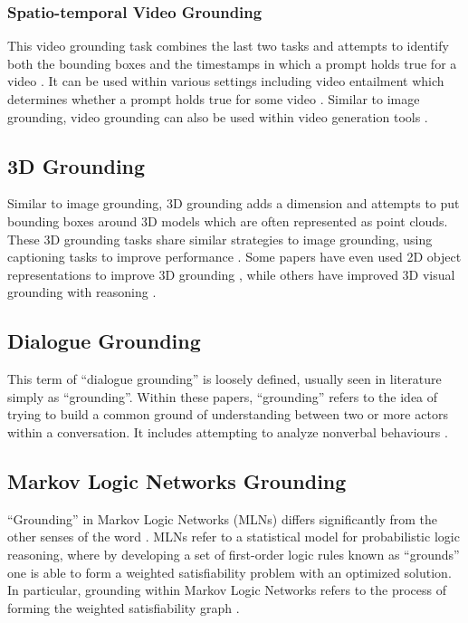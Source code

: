\documentclass[11pt]{article}
\begin{document}
\subsubsection{Spatio-temporal Video Grounding}
This video grounding task combines the last two tasks and attempts to identify both the bounding boxes and the timestamps in which a prompt holds true for a video \cite{Wasim_2024_CVPR_DINO,Chen_2024_CVPR_self_supervised_spatio_temporal,jin2022embracingconsistencyonestageapproach}. It can be used within various settings including video entailment which determines whether a prompt holds true for some video \cite{Chen_2021_ICCV_video_entailment}. Similar to image grounding, video grounding can also be used within video generation tools \cite{jeong2024groundavideozeroshotgroundedvideo}.

\subsection{3D Grounding}
\label{sec:3d}
Similar to image grounding, 3D grounding adds a dimension and attempts to put bounding boxes around 3D models which are often represented as point clouds. These 3D grounding tasks share similar strategies to image grounding, using captioning tasks to improve performance \cite{Cai_2022_CVPR_3DJCG,NEURIPS2023_exploiting_context_3d, NEURIPS2023_city_refer_3d,wang20233drpnet3drelativepositionaware}. Some papers have even used 2D object representations to improve 3D grounding \cite{Yang_2021_ICCV_sat_2d}, while others have improved 3D visual grounding with reasoning \cite{zhu2024scanreasonempowering3dvisual}.

\subsection{Dialogue Grounding}
\label{sec:dialogue}
This term of ``dialogue grounding'' is loosely defined, usually seen in literature simply as ``grounding''. Within these papers, ``grounding'' refers to the idea of trying to build a common ground of understanding between two or more actors within a conversation. It includes attempting to analyze nonverbal behaviours \cite{nakano-etal-2003-towards,Roque2007ReactingTA_dialogue, liu-etal-2012-towards,shaikh2024groundinggapslanguagemodel}.

\subsection{Markov Logic Networks Grounding}
\label{sec:markov}
``Grounding'' in Markov Logic Networks (MLNs) differs significantly from the other senses of the word \cite{NIPS2014_markov_logic_networks}. MLNs refer to a statistical model for probabilistic logic reasoning, where by developing a set of first-order logic rules known as ``grounds'' one is able to form a weighted satisfiability problem with an optimized solution. In particular, grounding within Markov Logic Networks refers to the process of forming the weighted satisfiability graph \cite{MLN4KB_markov}.
\end{document}
